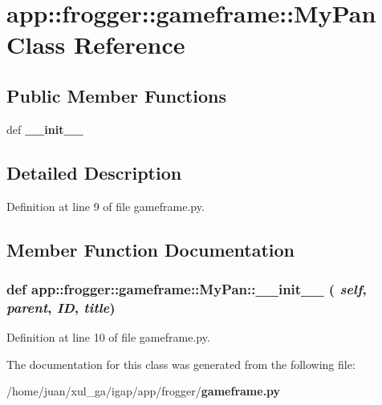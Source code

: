 \section{app::frogger::gameframe::MyPan Class Reference}
\label{classapp_1_1frogger_1_1gameframe_1_1MyPan}
\subsection*{Public Member Functions}
\begin{CompactItemize}
\item 
def {\bf \_\-\_\-init\_\-\_\-}
\end{CompactItemize}


\subsection{Detailed Description}


Definition at line 9 of file gameframe.py.

\subsection{Member Function Documentation}
\subsubsection{\setlength{\rightskip}{0pt plus 5cm}def app::frogger::gameframe::MyPan::\_\-\_\-init\_\-\_\- ( {\em self},  {\em parent},  {\em ID},  {\em title})}\label{classapp_1_1frogger_1_1gameframe_1_1MyPan_bfe0d3178e53ca330fb8ec782610150b}




Definition at line 10 of file gameframe.py.

The documentation for this class was generated from the following file:\begin{CompactItemize}
\item 
/home/juan/xul\_\-ga/igap/app/frogger/{\bf gameframe.py}\end{CompactItemize}
